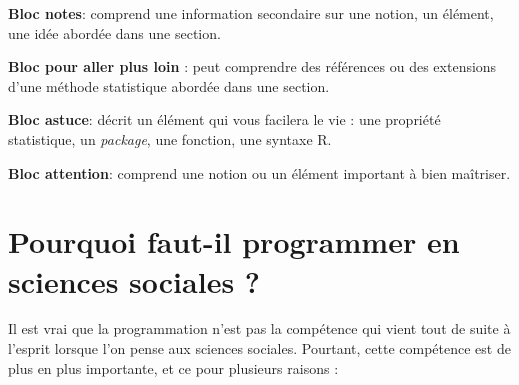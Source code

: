 \documentclass[
  11pt,
  french,
]{book}
\makeatletter
\newenvironment{kframev}{%
\medskip{}
\setlength{\fboxsep}{.8em}
 \def\at@end@of@kframev{}%
 \ifinner\ifhmode%
  \def\at@end@of@kframev{\end{minipage}}%
  \begin{minipage}{\columnwidth}%
 \fi\fi%
 \def\FrameCommand##1{\hskip\@totalleftmargin \hskip-\fboxsep
 \colorbox{shadebluecolor}{##1}\hskip-\fboxsep
     \hskip-\linewidth \hskip-\@totalleftmargin \hskip\columnwidth}%
 \MakeFramed {\advance\hsize-\width
   \@totalleftmargin\z@ \linewidth\hsize
   \@setminipage}}%
 {\par\unskip\endMakeFramed%
 \at@end@of@kframev}
\newenvironment{rmdblock}[1]
  {
  \begin{itemize}
  \renewcommand{\labelitemi}{
    \raisebox{-.7\height}[0pt][0pt]{
      {\setkeys{Gin}{width=3em,keepaspectratio}\texttt{[image: images/\#1]}}
    }
  }
  \setlength{\fboxsep}{1em}
  \begin{kframev}
  \small
  \item
  }
  {
  \end{kframev}
  \end{itemize}
  }
\newenvironment{bloc_notes}
  {\begin{rmdblock}{notes}}
  {\end{rmdblock}}
\newenvironment{bloc_aller_loin}
  {\begin{rmdblock}{aller_loin}}
  {\end{rmdblock}}
\newenvironment{bloc_astuce}
  {\begin{rmdblock}{astuce}}
  {\end{rmdblock}}
\newenvironment{bloc_attention}
  {\begin{rmdblock}{attention}}
  {\end{rmdblock}}
\makeatother
\begin{document}
\begin{bloc_notes}
\textbf{Bloc notes}: comprend une information secondaire sur une notion, un élément, une idée abordée dans une section.

\end{bloc_notes}

\begin{bloc_aller_loin}
\textbf{Bloc pour aller plus loin} : peut comprendre des références ou des extensions d'une méthode statistique abordée dans une section.

\end{bloc_aller_loin}

\begin{bloc_astuce}
\textbf{Bloc astuce}: décrit un élément qui vous facilera le vie : une propriété statistique, un \emph{package}, une fonction, une syntaxe R.

\end{bloc_astuce}

\begin{bloc_attention}
\textbf{Bloc attention}: comprend une notion ou un élément important à bien maîtriser.

\end{bloc_attention}

\hypertarget{pourquoi-faut-il-programmer-en-sciences-sociales}{%
\section*{Pourquoi faut-il programmer en sciences sociales ?}\label{pourquoi-faut-il-programmer-en-sciences-sociales}}

Il est vrai que la programmation n'est pas la compétence qui vient tout de suite à l'esprit lorsque l'on pense aux sciences sociales. Pourtant, cette compétence est de plus en plus importante, et ce pour plusieurs raisons :
\end{document}

